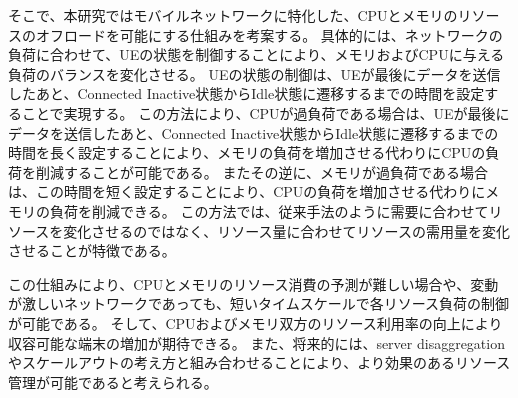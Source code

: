 \documentclass[a4j]{ujarticle}
\begin{document}
そこで、本研究ではモバイルネットワークに特化した、CPUとメモリのリソースのオフロードを可能にする仕組みを考案する。
具体的には、ネットワークの負荷に合わせて、UEの状態を制御することにより、メモリおよびCPUに与える負荷のバランスを変化させる。
UEの状態の制御は、UEが最後にデータを送信したあと、Connected Inactive状態からIdle状態に遷移するまでの時間を設定することで実現する。
この方法により、CPUが過負荷である場合は、UEが最後にデータを送信したあと、Connected Inactive状態からIdle状態に遷移するまでの時間を長く設定することにより、メモリの負荷を増加させる代わりにCPUの負荷を削減することが可能である。
またその逆に、メモリが過負荷である場合は、この時間を短く設定することにより、CPUの負荷を増加させる代わりにメモリの負荷を削減できる。
この方法では、従来手法のように需要に合わせてリソースを変化させるのではなく、リソース量に合わせてリソースの需用量を変化させることが特徴である。

この仕組みにより、CPUとメモリのリソース消費の予測が難しい場合や、変動が激しいネットワークであっても、短いタイムスケールで各リソース負荷の制御が可能である。
そして、CPUおよびメモリ双方のリソース利用率の向上により収容可能な端末の増加が期待できる。
また、将来的には、server disaggregationやスケールアウトの考え方と組み合わせることにより、より効果のあるリソース管理が可能であると考えられる。

\end{document}
